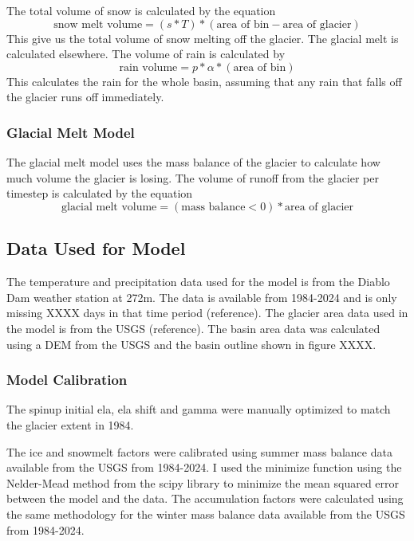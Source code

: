 \documentclass{article}
\begin{document}
The total volume of snow is calculated by the equation
\begin{equation}\text{snow melt volume}=(s*T)*(\text{area of bin}-\text{area of glacier})\end{equation}
This give us the total volume of snow melting off the glacier. The glacial melt is calculated elsewhere. The volume of rain is calculated by
\begin{equation}\text{rain volume}=p*\alpha*(\text{area of bin})\end{equation}
This calculates the rain for the whole basin, assuming that any rain that falls off the glacier runs off immediately.

\subsubsection{Glacial Melt Model}
The glacial melt model uses the mass balance of the glacier to calculate how much volume the glacier is losing. The volume of runoff from the 
glacier per timestep is calculated by the equation
\begin{equation}\text{glacial melt volume}=(\text{mass balance}<0)*\text{area of glacier}\end{equation}
\subsection{Data Used for Model}
The temperature and precipitation data used for the model is from the Diablo Dam weather station at 272m. The data is available from 1984-2024 
and is only missing XXXX days in that time period (reference). The glacier area data used in the model is from the USGS (reference). The basin 
area data was calculated using a DEM from the USGS and the basin outline shown in figure XXXX.

\subsubsection{Model Calibration}
The spinup initial ela, ela shift and gamma were manually optimized to match the glacier extent in 1984. 

The ice and snowmelt factors were calibrated using summer mass balance data available from the USGS from 1984-2024. I used the minimize 
function using the Nelder-Mead method from the scipy library to minimize the mean squared error between the model and the data. The 
accumulation factors were calculated using the same methodology for the winter mass balance data available from the USGS from 1984-2024.
\end{document}
